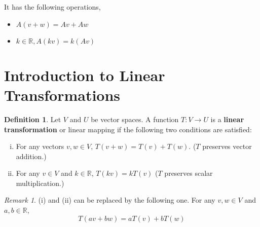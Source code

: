 \documentclass{report}
\theoremstyle{definition}
\newtheorem*{_def}{Definition}
\theoremstyle{remark}
\newtheorem{_rem}{Remark}[section]
\begin{document}
It has the following operations,
\begin{itemize}
 \item $A(v+w)=Av+Aw$
 \item $k\in \mathbb{R}, A(kv)=k(Av)$
\end{itemize}

\section{Introduction to Linear Transformations}

\begin{_def}
Let $V$ and $U$ be vector spaces.
A function $T: V\rightarrow U$ is a \textbf{linear transformation} or linear mapping if the following two conditions are satisfied:
\begin{enumerate}[i)]
 \item For any vectors $v, w\in V,\, T(v+w)=T(v)+T(w)$.
  ($T$ preserves vector addition.)
 \item For any $v\in V$ and $k\in \mathbb{R}$, $T(kv)=kT(v)$
  ($T$ preserves scalar multiplication.)
\end{enumerate}
\end{_def}

\begin{_rem}
(i) and (ii) can be replaced by the following one.
For any $v,w\in V$ and $a,b\in \mathbb{R}$,
\[T(av+bw)=aT(v)+bT(w)\]
\end{_rem}
\end{document}
